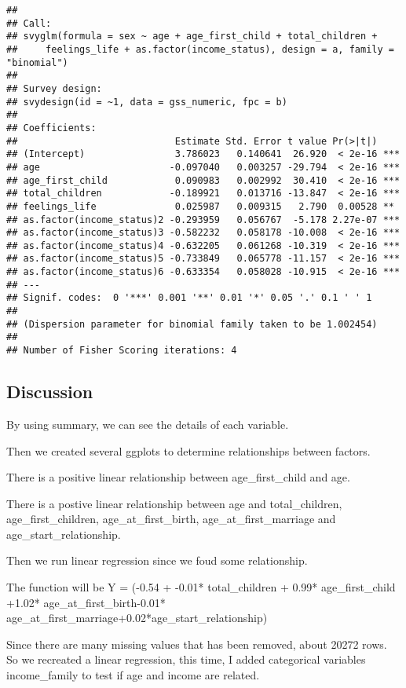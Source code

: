 \documentclass[
]{article}
\begin{document}
\begin{verbatim}
## 
## Call:
## svyglm(formula = sex ~ age + age_first_child + total_children + 
##     feelings_life + as.factor(income_status), design = a, family = "binomial")
## 
## Survey design:
## svydesign(id = ~1, data = gss_numeric, fpc = b)
## 
## Coefficients:
##                            Estimate Std. Error t value Pr(>|t|)    
## (Intercept)                3.786023   0.140641  26.920  < 2e-16 ***
## age                       -0.097040   0.003257 -29.794  < 2e-16 ***
## age_first_child            0.090983   0.002992  30.410  < 2e-16 ***
## total_children            -0.189921   0.013716 -13.847  < 2e-16 ***
## feelings_life              0.025987   0.009315   2.790  0.00528 ** 
## as.factor(income_status)2 -0.293959   0.056767  -5.178 2.27e-07 ***
## as.factor(income_status)3 -0.582232   0.058178 -10.008  < 2e-16 ***
## as.factor(income_status)4 -0.632205   0.061268 -10.319  < 2e-16 ***
## as.factor(income_status)5 -0.733849   0.065778 -11.157  < 2e-16 ***
## as.factor(income_status)6 -0.633354   0.058028 -10.915  < 2e-16 ***
## ---
## Signif. codes:  0 '***' 0.001 '**' 0.01 '*' 0.05 '.' 0.1 ' ' 1
## 
## (Dispersion parameter for binomial family taken to be 1.002454)
## 
## Number of Fisher Scoring iterations: 4
\end{verbatim}

\hypertarget{discussion}{%
\subsection{Discussion}\label{discussion}}

By using summary, we can see the details of each variable.

Then we created several ggplots to determine relationships between
factors.

There is a positive linear relationship between age\_first\_child and
age.

There is a postive linear relationship between age and total\_children,
age\_first\_children, age\_at\_first\_birth, age\_at\_first\_marriage
and age\_start\_relationship.

Then we run linear regression since we foud some relationship.

The function will be Y = (-0.54 + -0.01* total\_children + 0.99*
age\_first\_child +1.02* age\_at\_first\_birth-0.01*
age\_at\_first\_marriage+0.02*age\_start\_relationship)

Since there are many missing values that has been removed, about 20272
rows. So we recreated a linear regression, this time, I added
categorical variables income\_family to test if age and income are
related.
\end{document}
